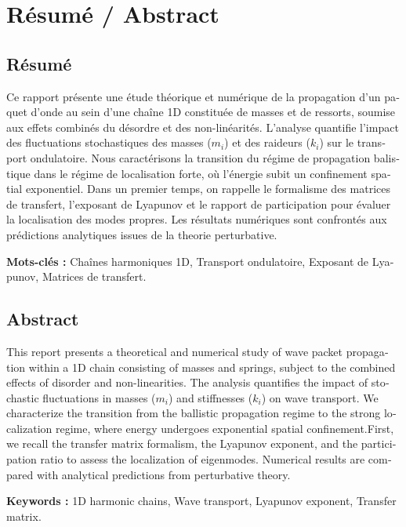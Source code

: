 \chapter*{Résumé / Abstract}

\begin{otherlanguage}{french}
\section*{Résumé}
Ce rapport présente une étude théorique et numérique de la propagation d'un paquet d'onde au sein d'une chaîne 1D constituée de masses et de ressorts, soumise aux effets combinés du désordre et des non-linéarités. L'analyse quantifie l'impact des fluctuations stochastiques des masses ($m_i$) et des raideurs ($k_i$) sur le transport ondulatoire. Nous caractérisons la transition du régime de propagation balistique dans le régime de localisation forte, où l'énergie subit un confinement spatial exponentiel. Dans un premier temps, on rappelle le formalisme des matrices de transfert, l'exposant de Lyapunov et le rapport de participation pour évaluer la localisation des modes propres. Les résultats numériques sont confrontés aux prédictions analytiques issues de la theorie perturbative.

\vspace*{2em}

\textbf{Mots-clés :} Chaînes harmoniques 1D, Transport ondulatoire, Exposant de Lyapunov, Matrices de transfert.
\end{otherlanguage}

\vspace{1cm}

\begin{otherlanguage}{english}
\section*{Abstract}
This report presents a theoretical and numerical study of wave packet propagation within a 1D chain consisting of masses and springs, subject to the combined effects of disorder and non-linearities. The analysis quantifies the impact of stochastic fluctuations in masses ($m_i$) and stiffnesses ($k_i$) on wave transport. We characterize the transition from the ballistic propagation regime to the strong localization regime, where energy undergoes exponential spatial confinement.First, we recall the transfer matrix formalism, the Lyapunov exponent, and the participation ratio to assess the localization of eigenmodes. Numerical results are compared with analytical predictions from perturbative theory.

\vspace*{2em}

\textbf{Keywords :} 1D harmonic chains, Wave transport, Lyapunov exponent, Transfer matrix.
\end{otherlanguage}